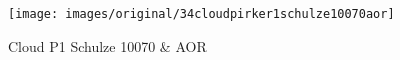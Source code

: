\begin{figure}[!h] 
\centering 
\texttt{[image: images/original/34cloudpirker1schulze10070aor]}
\caption{Cloud P1 Schulze 10070 & AOR}
\label{fig:34cloudpirker1schulze10070aor} 
\end{figure}


